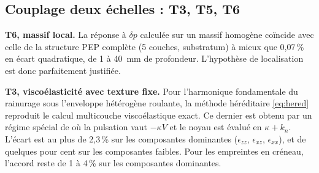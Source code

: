 \subsection{Couplage deux échelles : T3, T5, T6}
\textbf{T6, massif local.} La réponse à $\delta p$ calculée sur un massif homogène coïncide avec
celle de la structure PEP complète (5 couches, substratum) à mieux que
0,07\,\% en écart quadratique, de 1 à \SI{40}{mm}
de profondeur. L'hypothèse de localisation est donc parfaitement justifiée.

\textbf{T3, viscoélasticité avec texture fixe.} Pour l'harmonique fondamentale du rainurage sous
l'enveloppe hétérogène roulante, la méthode héréditaire \eqref{eq:hered} reproduit le calcul
multicouche viscoélastique exact. Ce dernier est obtenu par un régime spécial de \cs{} où la
pulsation vaut $-\kappa V$ et le noyau est évalué en $\kappa+k_n$. L'écart est au plus de
2,3\,\% sur les composantes dominantes ($\epsilon_{zz}$, $\epsilon_{xz}$, $\epsilon_{xx}$),
et de quelques pour cent sur les composantes faibles. Pour les empreintes en créneau, l'accord reste
de 1 à 4\,\% sur les composantes dominantes.

